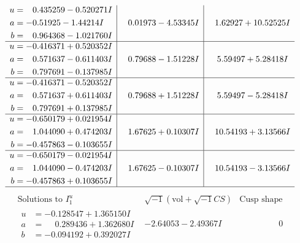 \documentclass[1p]{elsarticle_modified}
\theoremstyle{definition}
\newcommand{\I}{\sqrt{-1}}
\begin{document}
$$\begin{array}{c|c|c}
\begin{aligned}
u &= \phantom{-}0.435259 - 0.520271 I \\
a &= -0.51925 - 1.44214 I \\
b &= \phantom{-}0.964368 - 1.021760 I\end{aligned}
 & \phantom{-}0.01973 - 4.53345 I & \phantom{-}1.62927 + 10.52525 I \\ \hline\begin{aligned}
u &= -0.416371 + 0.520352 I \\
a &= \phantom{-}0.571637 - 0.611403 I \\
b &= \phantom{-}0.797691 - 0.137985 I\end{aligned}
 & \phantom{-}0.79688 - 1.51228 I & \phantom{-}5.59497 + 5.28418 I \\ \hline\begin{aligned}
u &= -0.416371 - 0.520352 I \\
a &= \phantom{-}0.571637 + 0.611403 I \\
b &= \phantom{-}0.797691 + 0.137985 I\end{aligned}
 & \phantom{-}0.79688 + 1.51228 I & \phantom{-}5.59497 - 5.28418 I \\ \hline\begin{aligned}
u &= -0.650179 + 0.021954 I \\
a &= \phantom{-}1.044090 + 0.474203 I \\
b &= -0.457863 - 0.103655 I\end{aligned}
 & \phantom{-}1.67625 + 0.10307 I & \phantom{-}10.54193 + 3.13566 I \\ \hline\begin{aligned}
u &= -0.650179 - 0.021954 I \\
a &= \phantom{-}1.044090 - 0.474203 I \\
b &= -0.457863 + 0.103655 I\end{aligned}
 & \phantom{-}1.67625 - 0.10307 I & \phantom{-}10.54193 - 3.13566 I\\
 \hline 
 \end{array}$$\newpage$$\begin{array}{c|c|c}  
\text{Solutions to }I^u_{1}& \I (\text{vol} + \sqrt{-1}CS) & \text{Cusp shape}\\
 \hline 
\begin{aligned}
u &= -0.128547 + 1.365150 I \\
a &= \phantom{-}0.289436 + 1.362680 I \\
b &= -0.094192 + 0.392027 I\end{aligned}
 & -2.64053 - 2.49367 I & \phantom{-0.000000 } 0 \\ \hline\begin{aligned}

\end{aligned}
\end{array}$$
\end{document}
